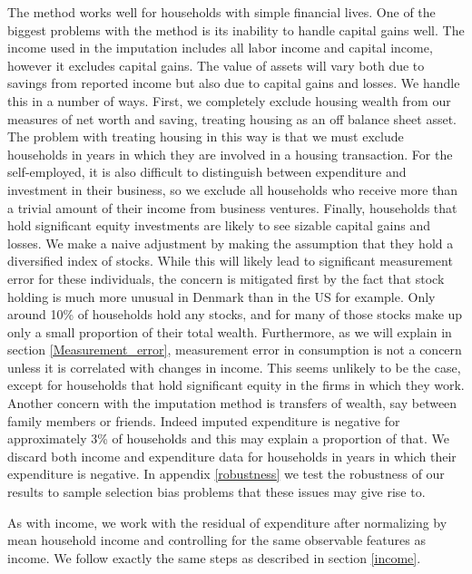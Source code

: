 \documentclass[titlepage]{\econtex}\newcommand{\texname}{ConsumptionHeterogeneity}
\begin{document}
The method works well for households with simple financial lives. One of the biggest problems with the method is its inability to handle capital gains well. The income used in the imputation includes all labor income and capital income, however it excludes capital gains. The value of assets will vary both due to savings from reported income but also due to capital gains and losses. We handle this in a number of ways. First, we completely exclude housing wealth from our measures of net worth and saving, treating housing as an off balance sheet asset. The problem with treating housing in this way is that we must exclude households in years in which they are involved in a housing transaction. For the self-employed, it is also difficult to distinguish between expenditure and investment in their business, so we exclude all households who receive more than a trivial amount of their income from business ventures. Finally, households that hold significant equity investments are likely to see sizable capital gains and losses. We make a naive adjustment by making the assumption that they hold a diversified index of stocks. While this will likely lead to significant measurement error for these individuals, the concern is mitigated first by the fact that stock holding is much more unusual in Denmark than in the US for example. Only around 10\% of households hold any stocks, and for many of those stocks make up only a small proportion of their total wealth. Furthermore, as we will explain in section \ref{Measurement_error}, measurement error in consumption is not a concern unless it is correlated with changes in income. This seems unlikely to be the case, except for households that hold significant equity in the firms in which they work. Another concern with the imputation method is transfers of wealth, say between family members or friends. Indeed imputed expenditure is negative for approximately 3\% of households and this may explain a proportion of that. We discard both income and expenditure data for households in years in which their expenditure is negative. In appendix \ref{robustness} we test the robustness of our results to sample selection bias problems that these issues may give rise to.

As with income, we work with the residual of expenditure after normalizing by mean household income and controlling for the same observable features as income. We follow exactly the same steps as described in section \ref{income}.
\end{document}

